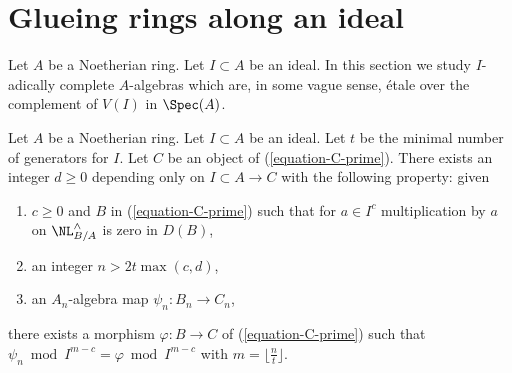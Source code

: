 \section{Glueing rings along an ideal}
\label{section-approximation}

\noindent
Let $A$ be a Noetherian ring. Let $I \subset A$ be an ideal.
In this section we study $I$-adically complete $A$-algebras
which are, in some vague sense, \'etale over the complement of
$V(I)$ in $\Spec(A)$.

\begin{lemma}
\label{lemma-get-morphism-general}
Let $A$ be a Noetherian ring. Let $I \subset A$ be an ideal.
Let $t$ be the minimal number of generators for $I$.
Let $C$ be an object of (\ref{equation-C-prime}).
There exists an integer $d \geq 0$ depending only on
$I \subset A \to C$ with the following property: given
\begin{enumerate}
\item $c \geq 0$ and $B$ in (\ref{equation-C-prime}) such that for $a \in I^c$
multiplication by $a$ on $\NL^\wedge_{B/A}$ is zero in $D(B)$,
\item an integer $n > 2t\max(c, d)$,
\item an $A_n$-algebra map $\psi_n : B_n \to C_n$,
\end{enumerate}
there exists a morphism $\varphi : B \to C$ of (\ref{equation-C-prime}) such
that $\psi_n \bmod I^{m - c} = \varphi \bmod I^{m - c}$
with $m = \lfloor \frac{n}{t} \rfloor$.
\end{lemma}

